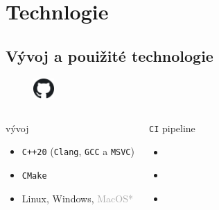 \documentclass[compress]{beamer}
\begin{document}
\section{Technlogie}

\subsection{Vývoj a pouižité technologie}

\begin{frame}
	\vspace{-0.5cm}
	\begin{figure}
		\centering
		\includegraphics[width=0.07\textwidth]{img/logos/github.pdf}
	\end{figure}
	\centering
	\vspace{-0.4cm}
	\href{https://github.com/silhavyj/ZeroMate}{}
	\vspace{-0.1cm}
	\noindent\makebox[\linewidth]{\rule{\textwidth}{0.4pt}}
	\begin{columns}
		\begin{block}{vývoj}
			\begin{itemize}
				\item \texttt{C++20} (\texttt{Clang}, \texttt{GCC} a \texttt{MSVC})
				\item \texttt{CMake}
				\item Linux, Windows, \textcolor{darkgray}{MacOS*}
			\end{itemize}
		\end{block}
		\begin{block}{\texttt{CI} pipeline}
			\begin{itemize}
				\item \href{https://app.codecov.io/gh/silhavyj/ZeroMate}{}
				\item \href{https://app.codacy.com/gh/silhavyj/ZeroMate/dashboard}{}
				\item \href{https://silhavyj.github.io/ZeroMate}{}
			\end{itemize}
		\end{block}
	\end{columns}
	\vspace{0.2cm}
	\noindent\makebox[\linewidth]{\rule{\textwidth}{0.4pt}}

\end{frame}
\end{document}
